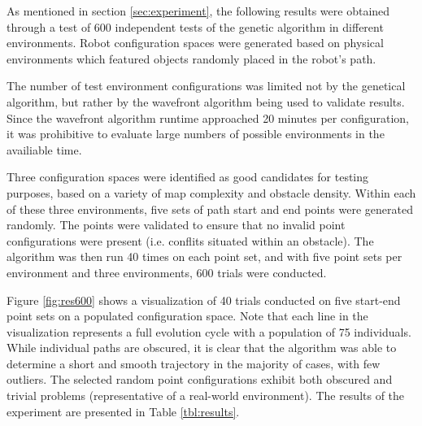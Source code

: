 %
As mentioned in section \ref{sec:experiment}, the following results were obtained through a test of 600 independent tests of the genetic algorithm in different environments. Robot configuration spaces were generated based on physical environments which featured objects randomly placed in the robot's path.

The number of test environment configurations was limited not by the genetical algorithm, but rather by the wavefront algorithm being used to validate results. Since the wavefront algorithm runtime approached 20 minutes per configuration, it was prohibitive to evaluate large numbers of possible environments in the availiable time.

Three configuration spaces were identified as good candidates for testing purposes, based on a variety of map complexity and obstacle density. Within each of these three environments, five sets of path start and end points were generated randomly. The points were validated to ensure that no invalid point configurations were present (i.e. conflits situated within an obstacle). The algorithm was then run 40 times on each point set, and with five point sets per environment and three environments, 600 trials were conducted.

Figure \ref{fig:res600} shows a visualization of 40 trials conducted on five start-end point sets on a populated configuration space. Note that each line in the visualization represents a full evolution cycle with a population of 75 individuals. While individual paths are obscured, it is clear that the algorithm was able to determine a short and smooth trajectory in the majority of cases, with few outliers. The selected random point configurations exhibit both obscured and trivial problems (representative of a real-world environment). The results of the experiment are presented in Table \ref{tbl:results}.

